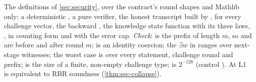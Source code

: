 The definitions of \cref{sec:security}, over the contract's round shapes and Mathlib only: a
deterministic , a pure verifier, the honest transcript built by
,  for every challenge vector, the backward
, the knowledge state function with its three laws, ,  in
counting form and  with the error cap. \emph{Check}:  is the
prefix of length $m$, so  and  are before and after round $m$;
 is an identity coercion; the $\exists w$ in  ranges over next-stage
witnesses; the worst case is over every statement, challenge round and prefix;  is
the size of a finite, non-empty challenge type;  is $2^{-128}$ (control
). At L1  is equivalent to RBR soundness
(\cref{thm:sec-collapse}).

